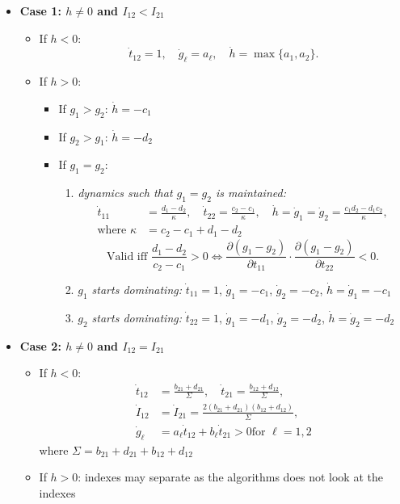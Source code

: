 \documentclass{article}
\begin{document}
\begin{itemize}[leftmargin=*, nosep]
  \item \textbf{Case 1: $h \neq 0$ and $I_{12} < I_{21}$}
  \begin{itemize}[leftmargin=*]
    \item If $h < 0$:
      \[
        \dot{t}_{12} = 1, \quad \dot{g}_\ell = a_\ell, \quad \dot{h} = \max\{a_1, a_2\}.
      \]
    \item If $h > 0$:
      \begin{itemize}
        \item If $g_1 > g_2$: $\dot{h} = -c_1$
        \item If $g_2 > g_1$: $\dot{h} = -d_2$
        \item If $g_1 = g_2$:
          \begin{enumerate}[leftmargin=*]
            \item \textit{dynamics such that $g_1=g_2$ is maintained:} 
            \[
              \begin{aligned}
              \dot{t}_{11} &= \frac{d_1 - d_2}{\kappa}, \quad
              \dot{t}_{22} = \frac{c_2 - c_1}{\kappa}, \quad
              \dot{h} = \dot{g}_1 = \dot{g}_2 = \frac{c_1 d_2 - d_1 c_2}{\kappa}, \\
              \text{where } \kappa &= c_2 - c_1 + d_1 - d_2
              \end{aligned}
            \]
             \[
            \text{Valid iff } \frac{d_1 - d_2}{c_2 - c_1} > 0 \iff \frac{\partial (g_1 - g_2)}{\partial t_{11}} \cdot \frac{\partial (g_1 - g_2)}{\partial t_{22}} < 0.
          \]
            \item \textit{$g_1$ starts dominating:} $\dot{t}_{11} = 1$, $\dot{g}_1 = -c_1$, $\dot{g}_2 = -c_2$, $\dot{h} = \dot{g}_1 = -c_1$
            \item \textit{$g_2$ starts dominating:} $\dot{t}_{22} = 1$, $\dot{g}_1 = -d_1$, $\dot{g}_2 = -d_2$, $\dot{h} = \dot{g}_2 = -d_2$
          \end{enumerate}
      \end{itemize}
  \end{itemize}

  \item \textbf{Case 2: $h \neq 0$ and $I_{12} = I_{21}$}
  \begin{itemize}[leftmargin=*]
    \item If $h < 0$:
      \[
        \begin{aligned}
        \dot{t}_{12} &= \frac{b_{21}+d_{21}}{\Sigma}, \quad \dot{t}_{21} = \frac{b_{12}+d_{12}}{\Sigma}, \\
        \dot{I}_{12} &= \dot{I}_{21} = \frac{2(b_{21}+d_{21})(b_{12}+d_{12})}{\Sigma}, \\
        \dot{g}_\ell &= a_\ell \dot{t}_{12} + b_\ell \dot{t}_{21} > 0 \text{for } \ell = 1, 2
        \end{aligned}
      \]
      where $\Sigma = b_{21} + d_{21} + b_{12} + d_{12}$
    \item If $h > 0$: indexes may separate as the algorithms does not look at the indexes
  \end{itemize}


\end{itemize}
\end{document}
